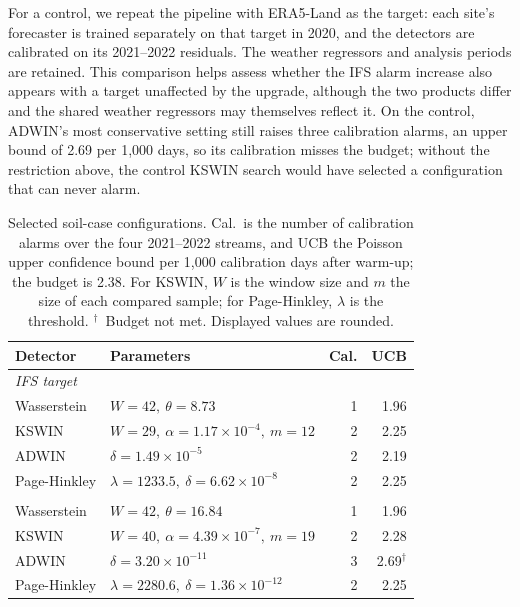 \documentclass[preprint,12pt]{elsarticle}
\begin{document}
For a control, we repeat the pipeline with ERA5-Land as the target: each site's forecaster is trained separately on that target in 2020, and the detectors are calibrated on its 2021--2022 residuals. The weather regressors and analysis periods are retained. This comparison helps assess whether the IFS alarm increase also appears with a target unaffected by the upgrade, although the two products differ and the shared weather regressors may themselves reflect it. On the control, ADWIN's most conservative setting still raises three calibration alarms, an upper bound of 2.69 per 1,000 days, so its calibration misses the budget; without the restriction above, the control KSWIN search would have selected a configuration that can never alarm.
\begin{table}[htbp]\centering\small
\caption{Selected soil-case configurations. Cal.\ is the number of calibration alarms over the four 2021--2022 streams, and UCB the Poisson upper confidence bound per 1,000 calibration days after warm-up; the budget is 2.38. For KSWIN, $W$ is the window size and $m$ the size of each compared sample; for Page-Hinkley, $\lambda$ is the threshold. $^\dagger$~Budget not met. Displayed values are rounded.}\label{tab:soil-params}
\begin{tabular}{llrr}
\toprule
Detector & Parameters & Cal. & UCB\\\midrule
\multicolumn{4}{l}{\textit{IFS target}}\\
Wasserstein & $W=42,\ \theta=8.73$ & 1 & 1.96\\
KSWIN & $W=29,\ \alpha=1.17\times10^{-4},\ m=12$ & 2 & 2.25\\
ADWIN & $\delta=1.49\times10^{-5}$ & 2 & 2.19\\
Page-Hinkley & $\lambda=1233.5,\ \delta=6.62\times10^{-8}$ & 2 & 2.25\\
\addlinespace
\multicolumn{4}{l}{\textit{ERA5-Land control}}\\
Wasserstein & $W=42,\ \theta=16.84$ & 1 & 1.96\\
KSWIN & $W=40,\ \alpha=4.39\times10^{-7},\ m=19$ & 2 & 2.28\\
ADWIN & $\delta=3.20\times10^{-11}$ & 3 & 2.69$^\dagger$\\
Page-Hinkley & $\lambda=2280.6,\ \delta=1.36\times10^{-12}$ & 2 & 2.25\\
\bottomrule
\end{tabular}
\end{table}
\end{document}
